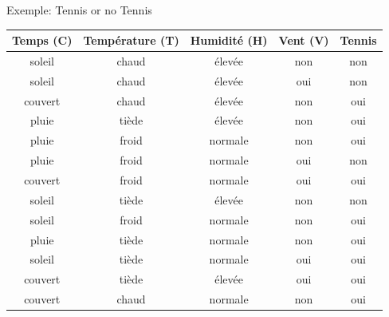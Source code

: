 \documentclass[8pt]{beamer}
\begin{document}
				\begin{frame}{Exemple: Tennis or no Tennis}
					\begin{table}[H]
						\begin{center}
							\begin{tabular}{c c c c c}
								\toprule
								Temps (C) & Température (T) & Humidité (H) & Vent (V) & Tennis\\
								\midrule
								soleil & chaud & élevée & non & non\\
								soleil & chaud & élevée & oui & non\\
								couvert & chaud & élevée & non & oui\\
								pluie & tiède & élevée & non & oui\\
								pluie & froid & normale & non & oui\\
								pluie & froid & normale & oui & non\\
								couvert & froid & normale & oui & oui\\
								soleil & tiède & élevée & non & non\\
								soleil & froid & normale & non & oui\\
								pluie & tiède & normale & non & oui\\
								soleil & tiède & normale & oui & oui\\
								couvert & tiède & élevée & oui & oui\\
								couvert & chaud & normale & non & oui\\
								\bottomrule
							\end{tabular}
						\end{center}
					\end{table}
				\end{frame}
\end{document}
